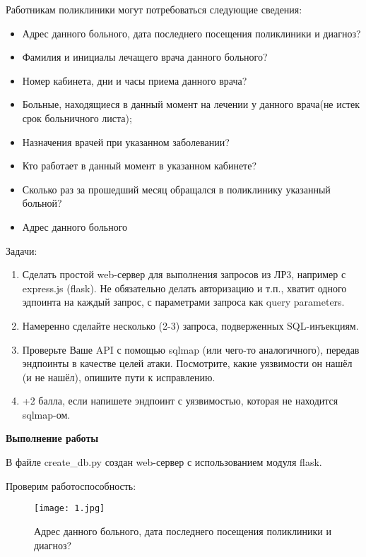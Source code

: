 \documentclass{article}
\begin{document}
Работникам поликлиники могут потребоваться следующие сведения:

\begin{itemize}
    \item Адрес данного больного, дата последнего посещения поликлиники и диагноз?
    \item Фамилия и инициалы лечащего врача данного больного?
    \item Номер кабинета, дни и часы приема данного врача?
    \item Больные, находящиеся в данный момент на лечении у данного врача(не истек срок больничного листа);
    \item Назначения врачей при указанном заболевании?
    \item Кто работает в данный момент в указанном кабинете?
    \item Сколько раз за прошедший месяц обращался в поликлинику указанный больной?
    \item Адрес данного больного
\end{itemize}

Задачи:

\begin{enumerate}
    \item Сделать простой web-сервер для выполнения запросов из ЛР3, например с express.js (flask). Не обязательно делать авторизацию и т.п., хватит одного эдпоинта на каждый запрос, с параметрами запроса как query parameters.
    \item Намеренно сделайте несколько (2-3) запроса, подверженных SQL-инъекциям.
    \item Проверьте Ваше API с помощью sqlmap (или чего-то аналогичного), передав эндпоинты в качестве целей атаки. Посмотрите, какие уязвимости он нашёл (и не нашёл), опишите пути к исправлению.
    \item +2 балла, если напишете эндпоинт с уязвимостью, которая не находится sqlmap-ом.
\end{enumerate}


\textbf{Выполнение работы}

В файле create\_db.py создан web-сервер с использованием модуля flask.

Проверим работоспособность:

\begin{figure}[h]
\centering
\texttt{[image: 1.jpg]}
\caption{Адрес данного больного, дата последнего посещения поликлиники и диагноз?}
\label{fig:mpr}
\end{figure}
\end{document}
